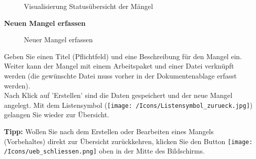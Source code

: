 \begin{figure}[H]
\caption{Visualisierung Statusübersicht der Mängel}
\end{figure}

\textbf{Neuen Mangel erfassen}

\begin{figure}[H]
\caption{Neuer Mangel erfassen}
\end{figure}

Geben Sie einen Titel (Pflichtfeld) und eine Beschreibung für den Mangel ein. Weiter kann der Mangel mit einem Arbeitspaket und einer Datei verknüpft werden (die gewünschte Datei muss vorher in der Dokumentenablage erfasst werden).\\
Nach Klick auf 'Erstellen' sind die Daten gespeichert und der neue Mangel angelegt. Mit dem Listensymbol (\texttt{[image: /Icons/Listensymbol\_zurueck.jpg]}) gelangen Sie wieder zur Übersicht.

\vspace{\baselineskip}

\textbf{Tipp:} Wollen Sie nach dem Erstellen oder Bearbeiten eines Mangels (Vorbehaltes) direkt zur Übersicht zurückkehren, klicken Sie den Button \texttt{[image: /Icons/ueb\_schliessen.png]} oben in der Mitte des Bildschirms.

